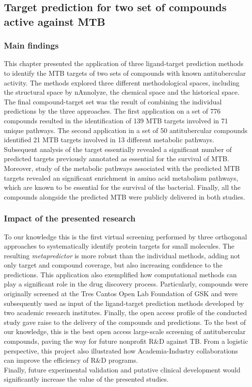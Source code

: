 \documentclass[11pt, b5paper,twoside]{tesi_upf}
\begin{document}
  \subsection{Target prediction for two set of compounds active against MTB}
  

\subsubsection{Main findings} 
\par This chapter presented the application of three ligand-target prediction methods to identify the MTB targets of two sets of compounds with known antitubercular activity. The methods explored three different methodological spaces, including the structural space by nAnnolyze, the chemical space and the historical space. The final compound-target set was the result of combining the individual predictions by the three approaches. The first application on a set of 776 compounds resulted in the identification of 139 MTB targets involved in 71 unique pathways. The second application in a set of 50 antitubercular compounds identified 21 MTB targets involved in 13 different metabolic pathways. Subsequent analysis of the target essentially revealed a significant number of predicted targets previously annotated as essential for the survival of MTB. Moreover, study of the metabolic pathways associated with the predicted MTB targets revealed an significant enrichment in amino acid metabolism pathways, which are known to be essential for the survival of the bacterial. Finally, all the compounds alongside the predicted MTB were publicly delivered in both studies. 
 
 \subsubsection{Impact of the presented research} 
 
 
\par To our knowledge this is the first virtual screening performed by three orthogonal approaches to systematically identify protein targets for small molecules. The resulting \textit{metapredictor} is more robust than the individual methods, adding not only target and compound coverage, but also increasing confidence to the predictions. This application also exemplified how computational methods can play a significant role in the drug discovery process. Particularly, compounds were originally screened at the Tres Cantos Open Lab Foundation of GSK and were subsequently used as input of the ligand-target prediction methods developed by two academic research institutes. Finally, the open access profile of the conducted study gave raise to the delivery of the compounds and predictions. To the best of our knowledge, this is the best open access large-scale screening of antitubercular compounds, paving the way for future nonprofit R$\&$D against TB.   
From a logistic perspective, this project also illustrated how Academia-Industry collaborations can improve the efficiency of R$\&$D programs. \\ 
Finally, future experimental validation and putative clinical development would significantly increase the value of the presented studies.  
\end{document}

